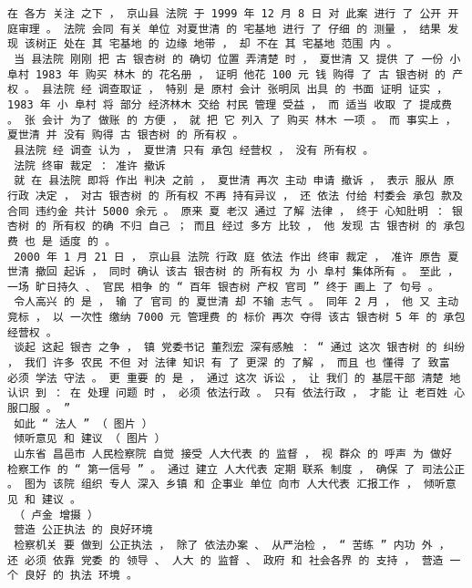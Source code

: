 \documentclass{article}
\begin{document}
\begin{Verbatim}[commandchars=\\\{\}]
 在 各方 关注 之下 ， 京山县 法院 于 1999 年 12 月 8 日 对 此案 进行 了 公开 开庭审理 。 法院 会同 有关 单位 对夏世清 的 宅基地 进行 了 仔细 的 测量 ， 结果 发现 该树正 处在 其 宅基地 的 边缘 地带 ， 却 不在 其 宅基地 范围 内 。 
 当 县法院 刚刚 把 古 银杏树 的 确切 位置 弄清楚 时 ， 夏世清 又 提供 了 一份 小阜村 1983 年 购买 林木 的 花名册 ， 证明 他花 100 元 钱 购得 了 古 银杏树 的 产权 。 县法院 经 调查取证 ， 特别 是 原村 会计 张明凤 出具 的 书面 证明 证实 ， 1983 年 小 阜村 将 部分 经济林木 交给 村民 管理 受益 ， 而 适当 收取 了 提成费 。 张 会计 为了 做账 的 方便 ， 就 把 它 列入 了 购买 林木 一项 。 而 事实上 ， 夏世清 并 没有 购得 古 银杏树 的 所有权 。 
 县法院 经 调查 认为 ， 夏世清 只有 承包 经营权 ， 没有 所有权 。 
 法院 终审 裁定 ： 准许 撤诉 
 就 在 县法院 即将 作出 判决 之前 ， 夏世清 再次 主动 申请 撤诉 ， 表示 服从 原 行政 决定 ， 对古 银杏树 的 所有权 不再 持有异议 ， 还 依法 付给 村委会 承包 款及 合同 违约金 共计 5000 余元 。 原来 夏 老汉 通过 了解 法律 ， 终于 心知肚明 ： 银杏树 的 所有权 的确 不归 自己 ； 而且 经过 多方 比较 ， 他 发现 古 银杏树 的 承包费 也 是 适度 的 。 
 2000 年 1 月 21 日 ， 京山县 法院 行政 庭 依法 作出 终审 裁定 ， 准许 原告 夏世清 撤回 起诉 ， 同时 确认 该古 银杏树 的 所有权 为 小 阜村 集体所有 。 至此 ， 一场 旷日持久 、 官民 相争 的 “ 百年 银杏树 产权 官司 ” 终于 画上 了 句号 。 
 令人高兴 的 是 ， 输 了 官司 的 夏世清 却 不输 志气 。 同年 2 月 ， 他 又 主动 竞标 ， 以 一次性 缴纳 7000 元 管理费 的 标价 再次 夺得 该古 银杏树 5 年 的 承包 经营权 。 
 谈起 这起 银杏 之争 ， 镇 党委书记 董烈宏 深有感触 ： “ 通过 这次 银杏树 的 纠纷 ， 我们 许多 农民 不但 对 法律 知识 有 了 更深 的 了解 ， 而且 也 懂得 了 致富 必须 学法 守法 。 更 重要 的 是 ， 通过 这次 诉讼 ， 让 我们 的 基层干部 清楚 地 认识 到 ： 在 处理 问题 时 ， 必须 依法行政 。 只有 依法行政 ， 才能 让 老百姓 心服口服 。 ” 
 如此 “ 法人 ” （ 图片 ） 
 倾听意见 和 建议 （ 图片 ） 
 山东省 昌邑市 人民检察院 自觉 接受 人大代表 的 监督 ， 视 群众 的 呼声 为 做好 检察工作 的 “ 第一信号 ” 。 通过 建立 人大代表 定期 联系 制度 ， 确保 了 司法公正 。 图为 该院 组织 专人 深入 乡镇 和 企事业 单位 向市 人大代表 汇报工作 ， 倾听意见 和 建议 。 
 （ 卢金 增摄 ） 
 营造 公正执法 的 良好环境 
 检察机关 要 做到 公正执法 ， 除了 依法办案 、 从严治检 ， “ 苦练 ” 内功 外 ， 还 必须 依靠 党委 的 领导 、 人大 的 监督 、 政府 和 社会各界 的 支持 ， 营造 一个 良好 的 执法 环境 。 

\end{Verbatim}
\end{document}
